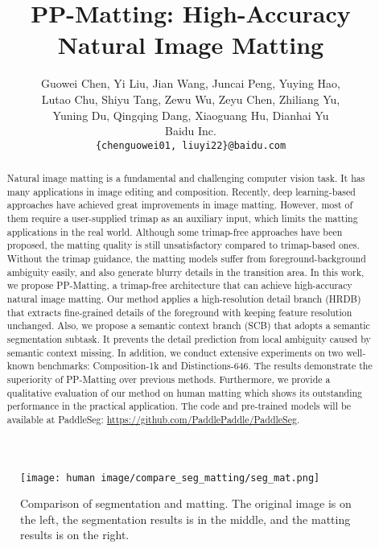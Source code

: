 \documentclass[10pt,twocolumn,letterpaper]{article}
\begin{document}
\title{PP-Matting: High-Accuracy Natural Image Matting}

\author{Guowei Chen, Yi Liu, Jian Wang, Juncai Peng, Yuying Hao,\\ Lutao Chu, Shiyu Tang, Zewu Wu, Zeyu Chen, Zhiliang Yu,\\ Yuning Du, Qingqing Dang,  Xiaoguang Hu, Dianhai Yu\\
        Baidu Inc.\\
        {\tt\small \{chenguowei01, liuyi22\}@baidu.com}
}
\maketitle

\begin{abstract}
Natural image matting is a fundamental and challenging computer vision task. It has many applications in image editing and composition. Recently, deep learning-based approaches have achieved great improvements in image matting. However, most of them require a user-supplied trimap as an auxiliary input, which limits the matting applications in the real world. Although some trimap-free approaches have been proposed, the matting quality is still unsatisfactory compared to trimap-based ones. Without the trimap guidance, the matting models suffer from foreground-background ambiguity easily, and also generate blurry details in the transition area. In this work, we propose PP-Matting, a trimap-free architecture that can achieve high-accuracy natural image matting. Our method applies a high-resolution detail branch (HRDB) that extracts fine-grained details of the foreground with keeping feature resolution unchanged. Also, we propose a semantic context branch (SCB) that adopts a semantic segmentation subtask. It prevents the detail prediction from local ambiguity caused by semantic context missing. In addition, we conduct extensive experiments on two well-known benchmarks: Composition-1k and Distinctions-646. The results demonstrate the superiority of PP-Matting over previous methods. Furthermore, we provide a qualitative evaluation of our method on human matting which shows its outstanding performance in the practical application. The code and pre-trained models will be available at PaddleSeg: \href{https://github.com/PaddlePaddle/PaddleSeg}{https://github.com/PaddlePaddle/PaddleSeg}.

\end{abstract}

\begin{figure}[t]
\centering
\texttt{[image: human image/compare\_seg\_matting/seg\_mat.png]}
\caption{Comparison of segmentation and matting. The original image is on the left, the segmentation results is in the middle, and the matting results is on the right.}
\label{fig:seg_mat}
\end{figure}
\end{document}
